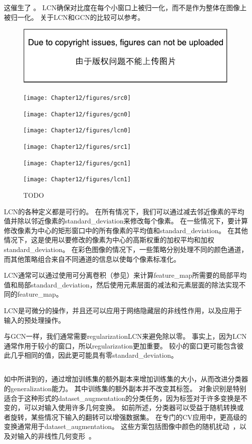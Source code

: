 这催生了 。
\gls{LCN}确保对比度在每个小窗口上被归一化，而不是作为整体在图像上被归一化。
关于\gls{LCN}和\gls{GCN}的比较可以参考。
\begin{figure}[!htb]
\ifOpenSource
\centerline{\includegraphics{figure.pdf}}
\else
	\centerline{\texttt{[image: Chapter12/figures/src0]}}
	\centerline{\texttt{[image: Chapter12/figures/gcn0]}}
	\centerline{\texttt{[image: Chapter12/figures/lcn0]}}	
	\centerline{\texttt{[image: Chapter12/figures/src1]}}
	\centerline{\texttt{[image: Chapter12/figures/gcn1]}}
	\centerline{\texttt{[image: Chapter12/figures/lcn1]}}				
\fi
	\caption{TODO}
	\label{fig:122}
\end{figure}

\gls{LCN}的各种定义都是可行的。
 在所有情况下，我们可以通过减去邻近像素的平均值并除以邻近像素的\gls{standard_deviation}来修改每个像素。
在一些情况下，要计算修改像素为中心的矩形窗口中的所有像素的平均值和\gls{standard_deviation}\citep{Pinto08}。
在其他情况下，这是使用以要修改的像素为中心的高斯权重的加权平均和加权\gls{standard_deviation}。
在彩色图像的情况下，一些策略分别处理不同的颜色通道，而其他策略组合来自不同通道的信息以使每个像素标准化\citep{sermanet-icpr-12}。

\gls{LCN}通常可以通过使用可分离卷积（参见）来计算\gls{feature_map}所需要的局部平均值和局部\gls{standard_deviation}，然后使用元素层面的减法和元素层面的除法实现不同的\gls{feature_map}。

\gls{LCN}是可微分的操作，并且还可以应用于网络隐藏层的非线性作用，以及应用于输入的预处理操作。

与\gls{GCN}一样，我们通常需要\gls{regularization}\gls{LCN}来避免除以零。
事实上，因为\gls{LCN}通常作用于较小的窗口，所以\gls{regularization}更加重要。
较小的窗口更可能包含彼此几乎相同的值，因此更可能具有零\gls{standard_deviation}。


\subsection{}
\label{sec:dataset_augmentation_chap12}
如中所讲到的，通过增加训练集的额外副本来增加训练集的大小，从而改进分类器的\gls{generalization}能力。
其中训练集的额外副本并不改变其标签。
对象识别是特别适合于这种形式的\gls{dataset_augmentation}的分类任务，因为标签对于许多变换是不变的，可以对输入使用许多几何变换。
如前所述，分类器可以受益于随机转换或者旋转，某些情况下输入的翻转可以增强数据集。
在专门的\gls{CV}应用中，更高级的变换通常用于\gls{dataset_augmentation}。
这些方案包括图像中颜色的随机扰动~\citep{Krizhevsky-2012}，以及对输入的非线性几何变形~\citep{chapter-gradient-document-2001}。





